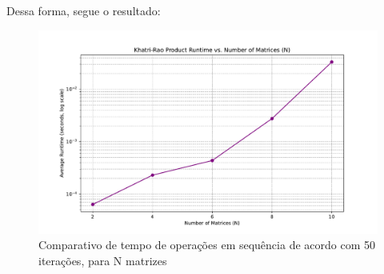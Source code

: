 \documentclass[a4paper, 12pt]{article}
\begin{document}
	Dessa forma, segue o resultado:
	\begin{figure}[!h]
		\centering
		\includegraphics[width=\linewidth]{images/chained.pdf}
		\caption{Comparativo de tempo de operações em sequência de acordo com 50 iterações, para N matrizes}
		\label{fig:chained}
	\end{figure}
	
\end{document}
